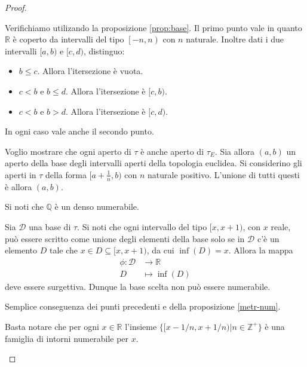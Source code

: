 \documentclass{article}
\begin{document}
\begin{proof}
    \begin{nlist}
        \item Verifichiamo utilizando la proposizione \ref{prop:base}. Il primo
        punto vale in quanto $\mathbb{R}$ \`e coperto da intervalli del tipo
        $\left[-n, n\right)$ con $n$ naturale. Inoltre dati i due intervalli
        $[a,b)$ e $[c,d)$, distinguo:
        \begin{itemize}
            \item $b\leq c$. Allora l'itersezione \`e vuota.
            \item $c < b$ e $b \leq d$. Allora l'itersezione \`e $[c,b)$.
            \item $c < b$ e $b > d$. Allora l'itersezione \`e $[c,d)$.
        \end{itemize}
        In ogni caso vale anche il secondo punto.

        \item Voglio mostrare che ogni aperto di $\tau$ \`e anche aperto di
        $\tau_E$. Sia allora $(a, b)$ un aperto della base degli intervalli
        aperti della topologia euclidea. Si considerino gli aperti in $\tau$
        della forma $[a+\frac{1}{n},b)$ con $n$ naturale positivo. L'unione di
        tutti questi \`e allora $(a,b)$.

        \item Si noti che $\mathbb{Q}$ \`e un denso numerabile.

        \item Sia $\mathcal{D}$ una base di $\tau$. Si noti che ogni intervallo
        del tipo $[x,x+1)$, con $x$ reale, pu\`o essere scritto come unione
        degli elementi della base solo se in $\mathcal{D}$ c'\`e un elemento $D$
        tale che $x \in D \subseteq [x, x+1)$, da cui $\inf(D) = x$. Allora la
        mappa
        \begin{align*}
            \phi:\mathcal{D}&\to \mathbb{R}\\
            D & \mapsto \inf(D)
        \end{align*}
        deve essere surgettiva. Dunque la base scelta non pu\`o essere
        numerabile.

        \item Semplice conseguenza dei punti precedenti e della proposizione
        \ref{metr-num}.

				\item Basta notare che per ogni $x \in \mathbb{R}$ l'insieme $\{
				[x-1/n, x+1/n) | n \in \mathbb{Z}^+\}$ è una famiglia di intorni
				numerabile per $x$.
    \end{nlist}
\end{proof}
\end{document}
